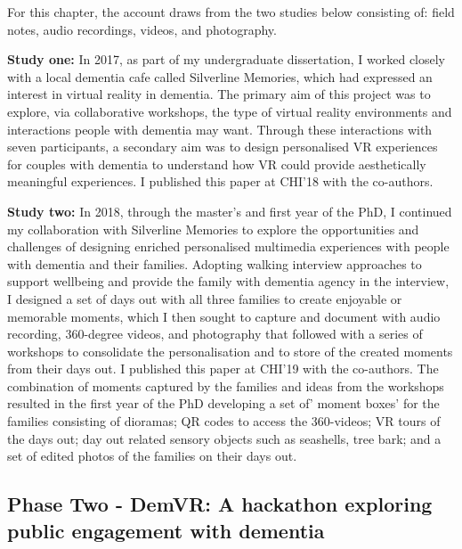 For this chapter, the account draws from the two studies below consisting of: field notes, audio recordings, videos, and photography. 

\textbf{Study one:} In 2017, as part of my undergraduate dissertation, I worked closely with a local dementia cafe called Silverline Memories, which had expressed an interest in virtual reality in dementia. The primary aim of this project was to explore, via collaborative workshops, the type of virtual reality environments and interactions people with dementia may want. Through these interactions with seven participants, a secondary aim was to design personalised VR experiences for couples with dementia to understand how VR could provide aesthetically meaningful experiences. I published this paper at CHI'18 with the co-authors.

\textbf{Study two:} In 2018, through the master's and first year of the PhD, I continued my collaboration with Silverline Memories to explore the opportunities and challenges of designing enriched personalised multimedia experiences with people with dementia and their families. Adopting walking interview approaches to support wellbeing and provide the family with dementia agency in the interview, I designed a set of days out with all three families to create enjoyable or memorable moments, which I then sought to capture and document with audio recording, 360-degree videos, and photography that followed with a series of workshops to consolidate the personalisation and to store of the created moments from their days out. I published this paper at CHI'19 with the co-authors. The combination of moments captured by the families and ideas from the workshops resulted in the first year of the PhD developing a set of' moment boxes' for the families consisting of dioramas; QR codes to access the 360-videos; VR tours of the days out; day out related sensory objects such as seashells, tree bark; and a set of edited photos of the families on their days out.

\subsection{Phase Two - DemVR: A hackathon exploring public engagement with dementia}

